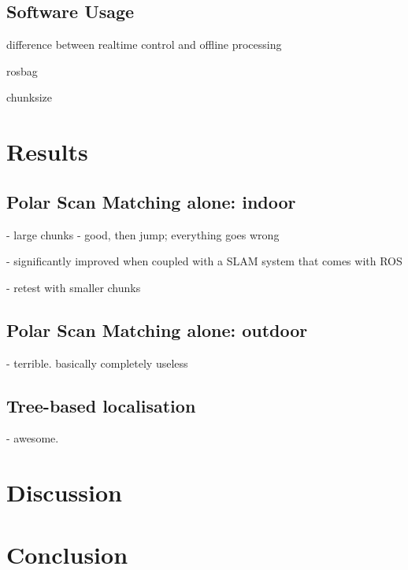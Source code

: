 \documentclass[12pt,oneside,a4paper]{book}
\begin{document}
\section{Software Usage}
\label{sec:software-usage}

difference between realtime control and offline processing

rosbag

chunksize

\chapter{Results}
\label{cha:results}

\section{Polar Scan Matching alone: indoor}
\label{sec:psm-indoor}

- large chunks - good, then jump; everything goes wrong

- significantly improved when coupled with a SLAM system that comes
with ROS

- retest with smaller chunks

\section{Polar Scan Matching alone: outdoor}
\label{sec:psm-outdoor}

- terrible. basically completely useless

\section{Tree-based localisation}
\label{sec:tree-based-local}

- awesome.


\chapter{Discussion}
\label{cha:discussion}

\chapter{Conclusion}
\label{cha:conclusion}



%

\backmatter


\end{document}
